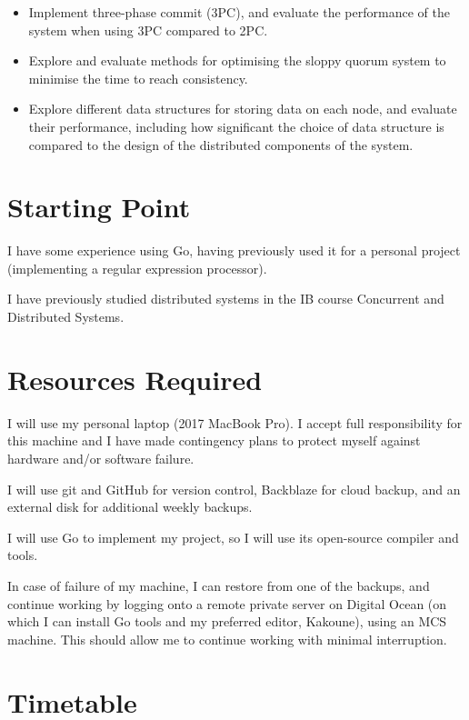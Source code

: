 \begin{itemize}
  \item
  Implement three-phase commit (3PC), and evaluate the performance of the system when using 3PC compared to 2PC.

  \item
  Explore and evaluate methods for optimising the sloppy quorum system to minimise the time to reach consistency.

  \item
  Explore different data structures for storing data on each node, and evaluate their performance, including how significant the choice of data structure is compared to the design of the distributed components of the system.

\end{itemize}

\section*{Starting Point}

I have some experience using Go, having previously used it for a personal project (implementing a regular expression processor).

I have previously studied distributed systems in the IB course Concurrent and Distributed Systems.

\section*{Resources Required}

I will use my personal laptop (2017 MacBook Pro). I accept full responsibility for this machine and I have made contingency plans to protect myself against hardware and/or software failure.

 I will use git and GitHub for version control, Backblaze for cloud backup, and an external disk for additional weekly backups.

I will use Go to implement my project, so I will use its open-source compiler and tools.

In case of failure of my machine, I can restore from one of the backups, and continue working by logging onto a remote private server on Digital Ocean (on which I can install Go tools and my preferred editor, Kakoune), using an MCS machine. This should allow me to continue working with minimal interruption.

\section*{Timetable}

